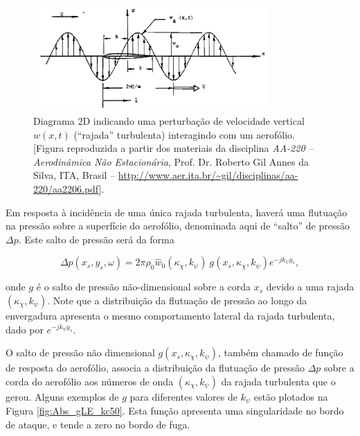 \documentclass[a4paper, 11pt, twoside]{article}
\begin{document}
\begin{figure}[htbp]
	\centering
	\includegraphics[width=0.8\textwidth]{../figures/gust_ProfGil_ITA_aula06.jpg}
	\caption{Diagrama 2D indicando uma perturbação de velocidade vertical $w(x, t)$ (``rajada'' turbulenta) interagindo com um aerofólio. [Figura reproduzida a partir dos materiais da disciplina \emph{AA-220 -- Aerodinâmica Não Estacionária}, Prof. Dr. Roberto Gil Annes da Silva, ITA, Brasil -- \url{http://www.aer.ita.br/~gil/disciplinas/aa-220/aa2206.pdf}].}
	\label{fig:gust_airfoil_2D}
\end{figure}


Em resposta à incidência de uma única rajada turbulenta, haverá uma flutuação na pressão sobre a superfície do aerofólio, denominada aqui de ``salto'' de pressão $\Delta p$. Este salto de pressão será da forma

\begin{equation}
\Delta p(x_s, y_s, \omega) =  2 \pi \rho_0 \hat{w}_0(\kappa_\chi, k_\psi) \ g(x_s, \kappa_\chi, k_\psi) e^{-j k_\psi y_s},
\label{eq:DeltaP_SingleGust}
\end{equation}

\noindent onde $g$ é o salto de pressão não-dimensional sobre a corda $x_s$ devido a uma rajada $(\kappa_\chi, k_\psi)$. Note que a distribuição da flutuação de pressão ao longo da envergadura apresenta o mesmo comportamento lateral da rajada turbulenta, dado por $e^{-j k_\psi y_s}$.

O salto de pressão não dimensional $g(x_s, \kappa_\chi, k_\psi)$, também chamado de função de resposta do aerofólio, associa a distribuição da flutuação de pressão $\Delta p$ sobre a corda do aerofólio aos números de onda $(\kappa_\chi, k_\psi)$ da rajada turbulenta que o gerou. Alguns exemplos de $g$ para diferentes valores de $k_\psi$ estão plotados na Figura \ref{fig:Abs_gLE_kc50}. Esta função apresenta uma singularidade no bordo de ataque, e tende a zero no bordo de fuga.
\end{document}
